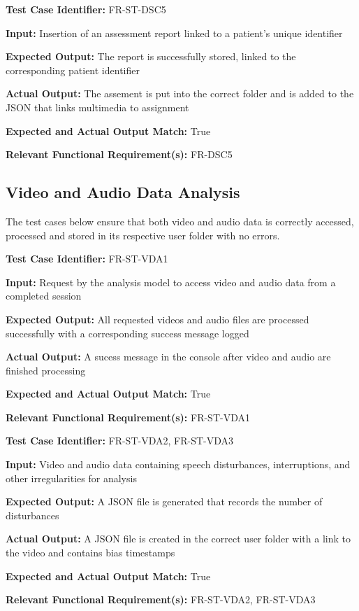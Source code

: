\documentclass[12pt, titlepage]{article}
\begin{document}
\begin{mdframed}[linewidth=0.5mm] \par
  \textbf{Test Case Identifier:} FR-ST-DSC5 \par
  \textbf{Input:} Insertion of an assessment report linked to a patient's unique identifier \par
  \textbf{Expected Output:} The report is successfully stored, linked to the corresponding patient identifier\par
  \textbf{Actual Output:} The assement is put into the correct folder and is added to the JSON that links multimedia to assignment \par
  \textbf{Expected and Actual Output Match:} True \par
  \textbf{Relevant Functional Requirement(s):} FR-DSC5
\end{mdframed}


\subsection{Video and Audio Data Analysis}
\hspace{2em}The test cases below ensure that both video and audio data is correctly accessed, processed and stored 
in its respective user folder with no errors.

\begin{mdframed}[linewidth=0.5mm] \par
  \textbf{Test Case Identifier:} FR-ST-VDA1 \par
  \textbf{Input:} Request by the analysis model to access video and audio data from a completed session \par
  \textbf{Expected Output:} All requested videos and audio files are processed successfully with a corresponding success message logged \par
  \textbf{Actual Output:} A sucess message in the console after video and audio are finished processing \par
  \textbf{Expected and Actual Output Match:} True \par
  \textbf{Relevant Functional Requirement(s):} FR-ST-VDA1
\end{mdframed}

\begin{mdframed}[linewidth=0.5mm] \par
  \textbf{Test Case Identifier:} FR-ST-VDA2, FR-ST-VDA3 \par
  \textbf{Input:} Video and audio data containing speech disturbances, interruptions, and other irregularities for analysis \par
  \textbf{Expected Output:} A JSON file is generated that records the number of disturbances \par
  \textbf{Actual Output:} A JSON file is created in the correct user folder with a link to the video and contains bias timestamps\par
  \textbf{Expected and Actual Output Match:} True \par
  \textbf{Relevant Functional Requirement(s):} FR-ST-VDA2, FR-ST-VDA3
\end{mdframed}
\end{document}

